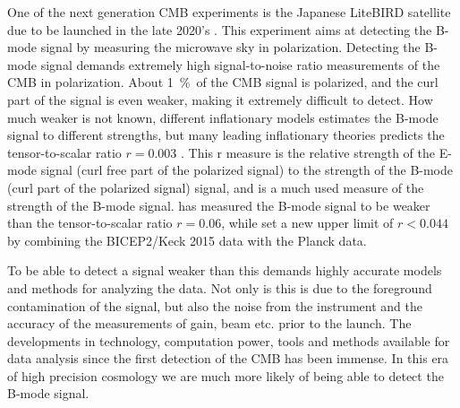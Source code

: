 \documentclass[twocolumn]{aa}
\begin{document}
  



One of the next generation CMB experiments is the Japanese LiteBIRD satellite due to be launched in the late 2020's \citep{Sugai_2020}. This experiment aims at detecting the B-mode signal by measuring the microwave sky in polarization. Detecting the B-mode signal demands extremely high signal-to-noise ratio measurements of the CMB in polarization. About 1~\%\  of the CMB signal is polarized, and the curl part of the signal is even weaker, making it extremely difficult to detect. How much weaker is not known, different inflationary models estimates the B-mode signal to different strengths, but many leading inflationary theories predicts the tensor-to-scalar ratio $r=0.003$ \cite{CITATION_NEEDED}. This r measure is the relative strength of the E-mode signal (curl free part of the polarized signal) to the strength of the B-mode (curl part of the polarized signal) signal, and is a much used measure of the strength of the B-mode signal. \citet{bicep2018} has measured the B-mode signal to be weaker than the tensor-to-scalar ratio $r=0.06$, while \citet{Tristram_2020} set a new upper limit of $r<0.044$ by combining the BICEP2/Keck 2015 data with the Planck data. 



To be able to detect a signal weaker than this demands highly accurate models and methods for analyzing the data. Not only is this is due to the foreground contamination of the signal, but also the noise from the instrument and the accuracy of the measurements of gain, beam etc. prior to the launch. The developments in technology, computation power, tools and methods available for data analysis since the first detection of the CMB has been immense. In this era of high precision cosmology we are much more likely of being able to detect the B-mode signal. 
\end{document}

